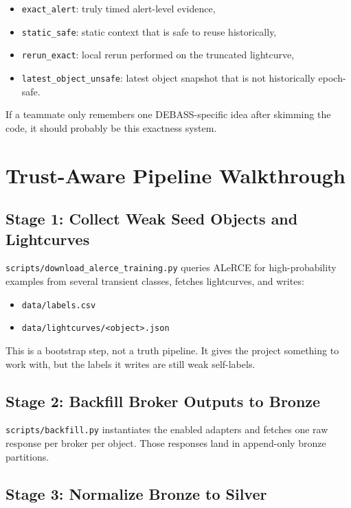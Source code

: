 \documentclass[11pt]{article}
\newcommand{\code}[1]{\texttt{#1}}
\begin{document}
\begin{itemize}
\item \code{exact\_alert}: truly timed alert-level evidence,
\item \code{static\_safe}: static context that is safe to reuse historically,
\item \code{rerun\_exact}: local rerun performed on the truncated lightcurve,
\item \code{latest\_object\_unsafe}: latest object snapshot that is not historically epoch-safe.
\end{itemize}

If a teammate only remembers one DEBASS-specific idea after skimming the code, it should probably be this exactness system.

\section{Trust-Aware Pipeline Walkthrough}

\subsection{Stage 1: Collect Weak Seed Objects and Lightcurves}

\code{scripts/download\_alerce\_training.py} queries ALeRCE for high-probability examples from several transient classes, fetches lightcurves, and writes:

\begin{itemize}
\item \code{data/labels.csv}
\item \code{data/lightcurves/<object>.json}
\end{itemize}

This is a bootstrap step, not a truth pipeline. It gives the project something to work with, but the labels it writes are still weak self-labels.

\subsection{Stage 2: Backfill Broker Outputs to Bronze}

\code{scripts/backfill.py} instantiates the enabled adapters and fetches one raw response per broker per object. Those responses land in append-only bronze partitions.

\subsection{Stage 3: Normalize Bronze to Silver}
\end{document}
